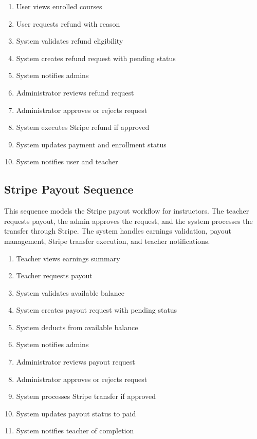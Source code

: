 \begin{enumerate}[topsep=0pt,itemsep=1pt,parsep=0pt,partopsep=0pt]
    \item User views enrolled courses
    \item User requests refund with reason
    \item System validates refund eligibility
    \item System creates refund request with pending status
    \item System notifies admins
    \item Administrator reviews refund request
    \item Administrator approves or rejects request
    \item System executes Stripe refund if approved
    \item System updates payment and enrollment status
    \item System notifies user and teacher
\end{enumerate}


\subsection{Stripe Payout Sequence}
This sequence models the Stripe payout workflow for instructors. The teacher
requests payout, the admin approves the request, and the system processes the
transfer through Stripe. The system handles earnings validation, payout
management, Stripe transfer execution, and teacher notifications.

\begin{enumerate}[topsep=0pt,itemsep=1pt,parsep=0pt,partopsep=0pt]
    \item Teacher views earnings summary
    \item Teacher requests payout
    \item System validates available balance
    \item System creates payout request with pending status
    \item System deducts from available balance
    \item System notifies admins
    \item Administrator reviews payout request
    \item Administrator approves or rejects request
    \item System processes Stripe transfer if approved
    \item System updates payout status to paid
    \item System notifies teacher of completion
\end{enumerate}

